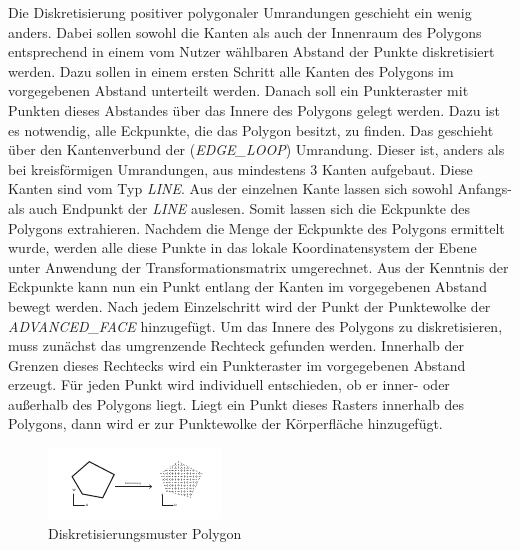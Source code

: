 Die Diskretisierung positiver polygonaler Umrandungen geschieht ein wenig anders. Dabei sollen sowohl die Kanten als auch der Innenraum des Polygons entsprechend  in einem vom Nutzer wählbaren Abstand der Punkte  diskretisiert werden. Dazu sollen in einem ersten Schritt alle Kanten des Polygons im vorgegebenen Abstand unterteilt werden. Danach soll ein Punkteraster mit Punkten dieses Abstandes über das Innere des Polygons gelegt werden. Dazu ist es notwendig, alle Eckpunkte, die das Polygon besitzt, zu finden. Das geschieht über den Kantenverbund der (\textit{EDGE\_LOOP}) Umrandung. Dieser ist, anders als bei kreisförmigen Umrandungen, aus mindestens 3 Kanten aufgebaut. Diese Kanten sind vom Typ \textit{LINE}. Aus der einzelnen Kante lassen sich sowohl Anfangs- als auch Endpunkt der \textit{LINE} auslesen. Somit lassen sich die Eckpunkte des Polygons extrahieren. Nachdem die Menge der Eckpunkte des Polygons ermittelt wurde, werden alle diese Punkte in das lokale Koordinatensystem der Ebene unter Anwendung der Transformationsmatrix umgerechnet.
Aus der Kenntnis der Eckpunkte kann nun ein Punkt entlang der Kanten im vorgegebenen Abstand bewegt werden. Nach jedem Einzelschritt wird der Punkt der Punktewolke der \textit{ADVANCED\_FACE} hinzugefügt. 
Um das Innere des Polygons zu diskretisieren, muss zunächst das umgrenzende Rechteck gefunden werden. Innerhalb der Grenzen dieses Rechtecks wird ein Punkteraster im vorgegebenen Abstand erzeugt. Für jeden Punkt wird individuell entschieden, ob er inner- oder außerhalb des Polygons liegt. Liegt ein Punkt dieses Rasters innerhalb des Polygons, dann wird er zur Punktewolke der Körperfläche hinzugefügt.  

\begin{figure}[h]
	\centering
	
	\includegraphics[width=\linewidth]{img/discretpolygon.pdf}
	
	\caption{Diskretisierungsmuster Polygon}
	\label{fig:discretpolygon}
	
\end{figure}

